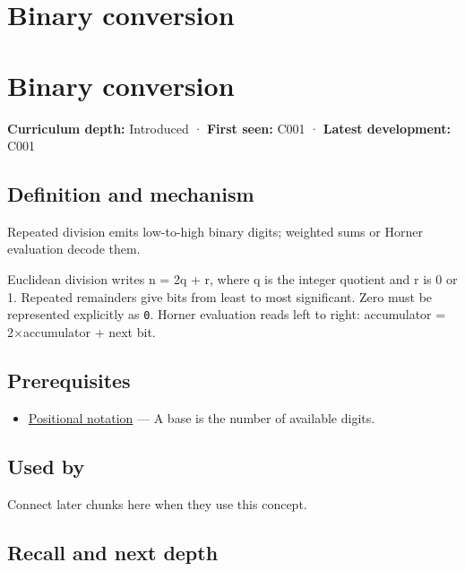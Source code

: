 \hypertarget{appendix-dc552784a2c0}{}
\section*{Binary conversion}
\section{Binary conversion}\label{appendix-dc552784a2c0-binary-conversion}

\textbf{Curriculum depth:} Introduced · \textbf{First seen:} C001 · \textbf{Latest development:} C001

\subsection{Definition and mechanism}\label{appendix-dc552784a2c0-definition-and-mechanism}

Repeated division emits low-to-high binary digits; weighted sums or Horner evaluation decode them.

Euclidean division writes n = 2q + r, where q is the integer quotient and r is 0 or 1. Repeated remainders give bits from least to most significant. Zero must be represented explicitly as \texttt{0}. Horner evaluation reads left to right: accumulator = 2×accumulator + next bit.

\subsection{Prerequisites}\label{appendix-dc552784a2c0-prerequisites}

\begin{itemize}
\tightlist
\item
  \hyperref[appendix-83c3f28f7bda]{Positional notation} --- A base is the number of available digits.
\end{itemize}

\subsection{Used by}\label{appendix-dc552784a2c0-used-by}

Connect later chunks here when they use this concept.

\subsection{Recall and next depth}\label{appendix-dc552784a2c0-recall-and-next-depth}

